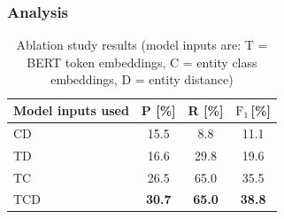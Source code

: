



\subsubsection{Analysis}





\begin{table}
  \centering
  \caption[Ablation study results]{Ablation study results (model inputs are: T = BERT token embeddings, C = entity class embeddings, D = entity distance)}
  \label{tab:finetunedablation}
  \begin{tabular}{lccc}
    \hline
    Model inputs used & P [\%] & R [\%] & $\text{F}_1$\,[\%] \\
    \hline
    \textvisiblespace CD & 15.5 & 8.8 & 11.1 \\
    T\textvisiblespace D & 16.6 & 29.8 & 19.6 \\
    TC\textvisiblespace & 26.5 & 65.0 & 35.5 \\
    TCD & \textbf{30.7} & \textbf{65.0} & \textbf{38.8} \\
    \hline
  \end{tabular}
\end{table}

